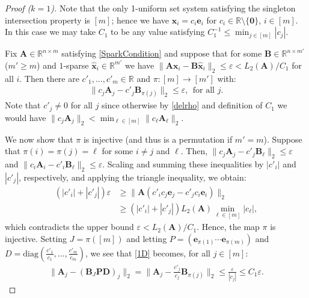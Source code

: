 \documentclass[9pt,twocolumn]{pnas-new}
\begin{document}
\begin{proof}[Proof ($k=1$)]
Note that the only 1-uniform set system satisfying the singleton intersection property is $[m]$; hence we have $\mathbf{x}_i = c_i \mathbf{e}_i$ for $c_i \in \mathbb{R} \setminus \{\mathbf{0}\}$, $i \in [m]$. In this case we may take $C_1$ to be any value satisfying $C_1^{-1} \leq \min_{j \in [m]} |c_{j}|$. 

Fix $\mathbf{A} \in \mathbb{R}^{n \times m}$ satisfying \eqref{SparkCondition} and suppose that for some $\mathbf{B} \in \mathbb{R}^{n \times m'}$ ($m' \geq m$) and $1$-sparse $\mathbf{\hat x}_i \in \mathbb{R}^{m'}$ we have  $\|\mathbf{A}\mathbf{x}_i - \mathbf{B}\mathbf{\hat x}_i\|_2 \leq \varepsilon < L_2(\mathbf{A}) / C_1$ for all $i$. Then there are $c'_1, \ldots, c'_m \in \mathbb{R}$ and $\pi: [m] \to [m']$ with:
\begin{align}\label{1D}
\|c_j\mathbf{A}_j - c'_j\mathbf{B}_{\pi(j)}\|_2 \leq \varepsilon, \ \ \text{for all $j$}.
\end{align} 
Note that $c'_j \neq 0$ for all $j$ since otherwise by \eqref{delrho} and definition of $C_1$ we would have $\|c_j\mathbf{A}_j\|_2 < \min_{\ell \in [m]}\|c_{\ell}\mathbf{A}_{\ell}\|_2$. 

We  now show that $\pi$ is injective (and thus is a permutation if $m' = m$). Suppose that $\pi(i) = \pi(j) = \ell$ for some $i \neq j$ and $\ell$. Then, $\|c_{j}\mathbf{A}_{j} - c'_{j}\mathbf{B}_{\ell}\|_2 \leq \varepsilon$ and $\|c_{i}\mathbf{A}_{i} - c'_{i} \mathbf{B}_{\ell}\|_2  \leq \varepsilon$. Scaling and summing these inequalities by $|c'_{i}|$ and $|c'_{j}|$, respectively, and applying the triangle inequality, we obtain:
\begin{align*}%
(|c'_{i}| + |c'_{j}|) \varepsilon
&\geq\|\mathbf{A}(c'_{i}c_{j} \mathbf{e}_{j} - c'_{j}c_{i}\mathbf{e}_{i})\|_2 \nonumber \\ 
&\geq  \left( |c'_{i}| + |c'_{j}| \right) L_2(\mathbf{A}) \min_{\ell \in [m]} |c_\ell |,
\end{align*}
%
which contradicts the upper bound $\varepsilon < L_2(\mathbf{A})/C_1$. Hence, the map $\pi$ is injective. Setting $J = \pi([m])$ and letting $P = \left( \mathbf{e}_{\pi(1)} \cdots \mathbf{e}_{\pi(m)}\right)$ and $D = \text{diag}(\frac{c'_1}{c_1},\ldots,\frac{c'_m}{c_m})$, we see that \eqref{1D} becomes, for all $j \in [m]$:
\begin{align*}%
\|\mathbf{A}_j - (\mathbf{B}_J\mathbf{PD})_j\|_2 
= \|\mathbf{A}_j - \frac{c'_j}{c_j}\mathbf{B}_{\pi(j)}\|_2 
\leq \frac{\varepsilon}{|c_j|} 
\leq C_1\varepsilon.
\end{align*}
\end{proof}
\end{document}
